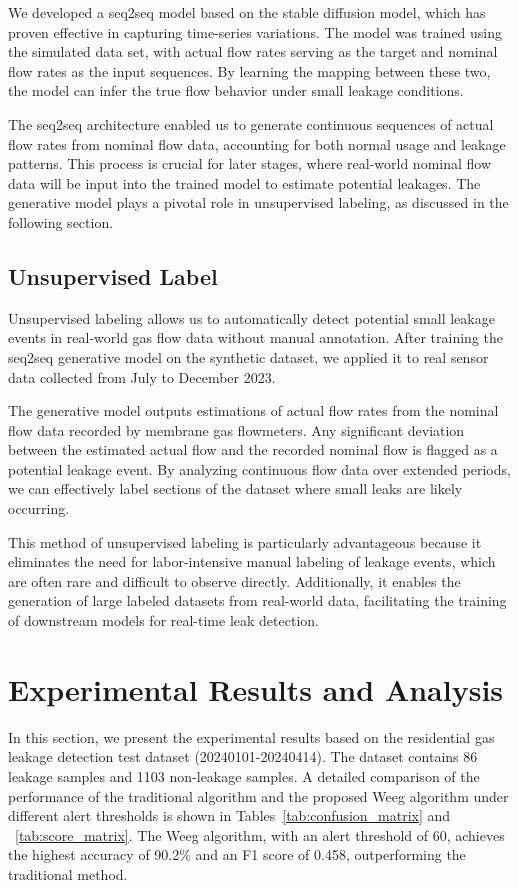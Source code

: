 \documentclass[10pt, sigconf]{acmart}
\begin{document}
We developed a seq2seq model based on the stable diffusion model, which has proven effective in capturing time-series variations. The model was trained using the simulated data set, with actual flow rates serving as the target and nominal flow rates as the input sequences. By learning the mapping between these two, the model can infer the true flow behavior under small leakage conditions.

The seq2seq architecture enabled us to generate continuous sequences of actual flow rates from nominal flow data, accounting for both normal usage and leakage patterns. This process is crucial for later stages, where real-world nominal flow data will be input into the trained model to estimate potential leakages. The generative model plays a pivotal role in unsupervised labeling, as discussed in the following section.

\subsection{Unsupervised Label}

Unsupervised labeling allows us to automatically detect potential small leakage events in real-world gas flow data without manual annotation. After training the seq2seq generative model on the synthetic dataset, we applied it to real sensor data collected from July to December 2023.

The generative model outputs estimations of actual flow rates from the nominal flow data recorded by membrane gas flowmeters. Any significant deviation between the estimated actual flow and the recorded nominal flow is flagged as a potential leakage event. By analyzing continuous flow data over extended periods, we can effectively label sections of the dataset where small leaks are likely occurring.

This method of unsupervised labeling is particularly advantageous because it eliminates the need for labor-intensive manual labeling of leakage events, which are often rare and difficult to observe directly. Additionally, it enables the generation of large labeled datasets from real-world data, facilitating the training of downstream models for real-time leak detection. 

\section{Experimental Results and Analysis}

In this section, we present the experimental results based on the residential gas leakage detection test dataset (20240101-20240414). The dataset contains 86 leakage samples and 1103 non-leakage samples. A detailed comparison of the performance of the traditional algorithm and the proposed Weeg algorithm under different alert thresholds is shown in Tables~\ref{tab:confusion_matrix} and ~\ref{tab:score_matrix}. The Weeg algorithm, with an alert threshold of 60, achieves the highest accuracy of 90.2\% and an F1 score of 0.458, outperforming the traditional method.
\end{document}
